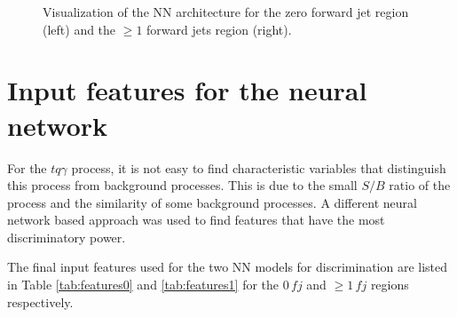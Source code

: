 \begin{figure}
\begin{subfigure}{.5\textwidth}
    \end{subfigure}
    \caption{Visualization of the NN architecture for the zero forward jet region (left) and the $\geq 1$ forward jets region (right).}
    \label{fig:models}
\end{figure}

\section{Input features for the neural network}
\label{sec:inputfeatures}

For the $tq\gamma$ process, it is not easy to find characteristic variables that distinguish this process from background processes. 
This is due to the small $S/B$ ratio of the process and the similarity of some background processes. 
A different neural network based approach was used to find features that have the most discriminatory power. 

The final input features used for the two NN models for discrimination are listed in Table \ref{tab:features0} and \ref{tab:features1} for the $0\, fj$ and $\geq 1\, fj$ regions respectively.

